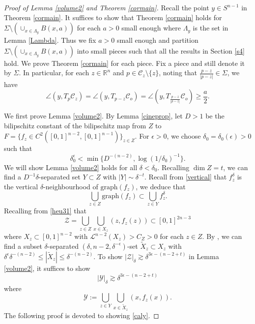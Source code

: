 \documentclass[11pt,a4paper,reqno]{amsart}
\newcommand{\R}{\mathbb{R}}
\newcommand{\calL}{\mathcal{L}}
\newcommand{\calC}{\mathcal{C}}
\newcommand{\1}{\mathbf{1}}
\numberwithin{equation}{section}
\theoremstyle{plain}
\theoremstyle{definition}
\theoremstyle{remark}
\begin{document}
\begin{proof}[Proof of Lemma \ref{volume2} and Theorem \ref{cormain}]
    Recall the point $y \in S^{n-1}$ in Theorem \ref{cormain}.
    It suffices to show that Theorem \ref{cormain} holds for $\Sigma \setminus (\cup_{x \in \Lambda_y}B(x,a))$ for each $a>0$ small enough where $\Lambda_y$ is the set in Lemma \ref{Lambda}.
    Thus we fix $a>0$ small enough and partition $\Sigma \setminus (\cup_{x \in \Lambda_y}B(x,a))$ into small pieces such that all the results in Section \ref{s4} hold.
    We prove Theorem \ref{cormain} for each piece. Fix a piece and still denote it by $\Sigma$. In particular, for each $z \in \R^n$ and $p \in \calC_z\setminus\{z\}$, noting that $\frac{p-z}{|p-z|} \in \Sigma$, we have
    \begin{equation}\label{ang2}
      \angle (y, T_p\calC_z)=\angle (y, T_{p-z}\calC_{o})=\angle (y, T_{\frac{p-z}{|p-z|}}\calC_o) \ge \frac{a}2.
    \end{equation}


    We first prove Lemma \ref{volume2}. By Lemma \ref{cineprop}, let $D>1$ be the bilipschitz constant of the bilipschitz map from $Z$ to $F=\{f_{z} \in C^2( [0,1]^{n-2},[0,1]^{n-1})\}_{z \in Z}$. For $\epsilon>0$, we choose $\delta_0=\delta_0(\epsilon)>0$ such that
    $$  \delta_0^\epsilon < \min\{D^{-(n-2)}, \log(1/\delta_0)^{-1}\}.  $$
    We will show Lemma \ref{volume2} holds for all $\delta<\delta_0$.
    Recalling $\dim Z = t$,
     we can find a $D^{-1}\delta$-separated set $Y\subset Z$ with $|Y| \sim \delta^{-t}$. Recall from \eqref{vertical} that $f_z^\delta$ is the vertical $\delta$-neighbourhood of $\mbox{graph}(f_z)$, we deduce that
     $$  \bigcup_{z \in Z}\mbox{graph}(f_z) \subset \bigcup_{z \in Y}f_z^\delta.$$
     Recalling from \eqref{heu31} that
     $$\mathcal{Z} = \bigcup_{z \in Z} \bigcup_{x \in X_z}(z, f_z(z)) \subset [0,1]^{2n-3}$$
     where
     $X_z \subset [0,1]^{n-2}$ with $\calL^{n-2}(X_z)>C_Z>0$ for each $z \in Z$. By \cite[Lemma 2.7]{orponen2023hausdorff}, we can find a subset $\delta$-separated $(\delta,n-2,\delta^{-\epsilon})$-set $\widetilde{X}_z \subset X_z$ with $\delta^{\epsilon}\delta^{-(n-2)} \le |\widetilde{X}_z| \le \delta^{-(n-2)}$.
    To show
    $ |\mathcal{Z}|_{\delta} \gtrsim \delta^{3\epsilon - (n-2 +t)}$ in Lemma \ref{volume2},
    it suffices to show
    \begin{equation}\label{caly}
      |\mathcal{Y}|_{\delta}\gtrsim \delta^{3\epsilon - (n-2 +t)}
    \end{equation}
    where
     $$  \mathcal{Y} := \bigcup_{z \in Y} \bigcup_{x \in \widetilde{X}_z }(x, f_z(x)). $$
The following proof is devoted to showing \eqref{caly}.


\end{proof}
\end{document}
